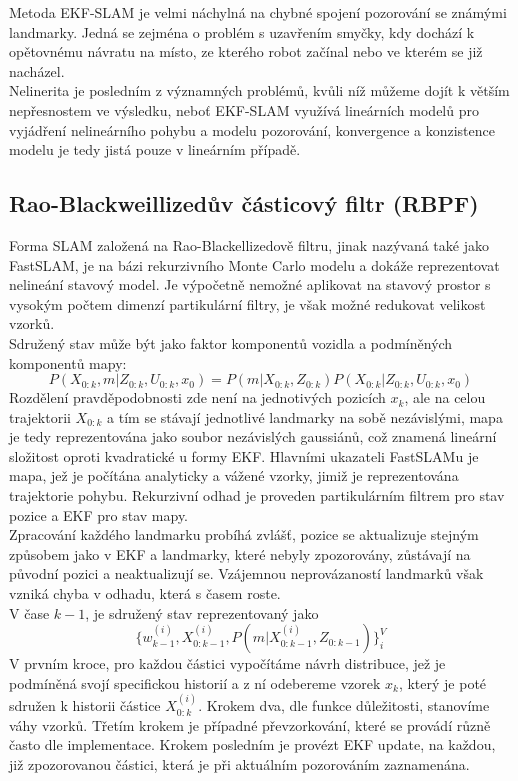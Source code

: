 \documentclass[11pt]{article}
\begin{document}
\indent Metoda EKF-SLAM je velmi náchylná na chybné spojení pozorování se známými landmarky. Jedná se zejména o problém s uzavřením smyčky, kdy dochází k opětovnému návratu na místo, ze kterého robot začínal nebo ve kterém se již nacházel.\\
\indent Nelinerita je posledním z významných problémů, kvůli níž můžeme dojít k větším nepřesnostem ve výsledku, neboť EKF-SLAM využívá lineárních modelů pro vyjádření nelineárního pohybu a modelu pozorování, konvergence a konzistence modelu je tedy jistá pouze v lineárním případě. 


\subsection{Rao-Blackweillizedův částicový filtr (RBPF)}
Forma SLAM založená na Rao-Blackellizedově filtru, jinak nazývaná také jako FastSLAM, je na bázi rekurzivního Monte Carlo modelu a dokáže reprezentovat nelineání stavový model. Je výpočetně nemožné aplikovat na stavový prostor s vysokým počtem dimenzí partikulární filtry, je však možné redukovat velikost vzorků. \\
Sdružený stav může být jako faktor komponentů vozidla a podmíněných komponentů mapy:
$$P(X_{0:k},m|Z_{0:k},U_{0:k},x_0)=P(m|X_{0:k},Z_{0:k})P(X_{0:k}|Z_{0:k},U_{0:k},x_0) $$ 
Rozdělení pravděpodobnosti zde není na jednotivých pozicích $x_k$, ale na celou trajektorii $X_{0:k}$ a tím se stávají jednotlivé landmarky na sobě nezávislými, mapa je tedy reprezentována jako soubor nezávislých gaussiánů, což znamená lineární složitost oproti kvadratické u formy EKF. Hlavními ukazateli FastSLAMu je mapa, jež je počítána analyticky a vážené vzorky, jimiž je reprezentována trajektorie pohybu. Rekurzivní odhad je proveden partikulárním filtrem pro stav pozice a EKF pro stav mapy.\\
\indent Zpracování každého landmarku probíhá zvlášť, pozice se aktualizuje stejným způsobem jako v EKF a landmarky, které nebyly zpozorovány, zůstávají na původní pozici a neaktualizují se. Vzájemnou neprovázaností landmarků však vzniká chyba v odhadu, která s časem roste.\\
\indent V čase $k-1$, je sdružený stav reprezentovaný jako 
$$\{w^{(i)}_{k-1},X^{(i)}_{0:k-1},P(m|X^{(i)}_{0:k-1},Z_{0:k-1})\}^V_i$$
V prvním kroce, pro každou částici vypočítáme návrh distribuce, jež je podmíněná svojí specifickou historií a z ní odebereme vzorek $x_k$, který je poté sdružen k historii částice $X^{(i)}_{0:k}$. Krokem dva, dle funkce důležitosti, stanovíme váhy vzorků. Třetím krokem je případné převzorkování, které se provádí různě často dle implementace. Krokem posledním je provézt EKF update, na každou, již zpozorovanou částici, která je při aktuálním pozorováním zaznamenána. 
\end{document}
